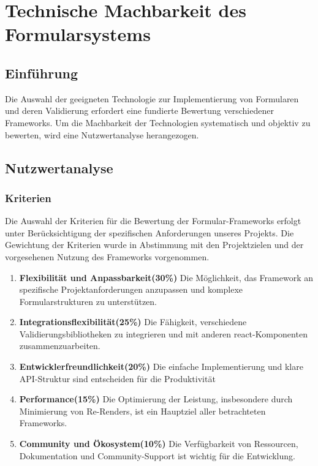 \section{Technische Machbarkeit des Formularsystems}

\subsection{Einführung}
Die Auswahl der geeigneten Technologie zur Implementierung von Formularen und deren Validierung erfordert eine fundierte Bewertung verschiedener Frameworks. Um die Machbarkeit der Technologien systematisch und objektiv zu bewerten, wird eine Nutzwertanalyse herangezogen. 

\subsection{Nutzwertanalyse}

\subsubsection{Kriterien}
Die Auswahl der Kriterien für die Bewertung der Formular-Frameworks erfolgt unter Berücksichtigung der spezifischen Anforderungen unseres Projekts. Die Gewichtung der Kriterien wurde in Abstimmung mit den Projektzielen und der vorgesehenen Nutzung des Frameworks vorgenommen.

\begin{enumerate}
	\item \textbf{Flexibilität und Anpassbarkeit(30\%)}  Die Möglichkeit, das Framework an spezifische Projektanforderungen anzupassen und komplexe Formularstrukturen zu unterstützen.
	\item \textbf{Integrationsflexibilität(25\%)} Die Fähigkeit, verschiedene Validierungsbibliotheken zu integrieren und mit anderen \gls{react}-Komponenten zusammenzuarbeiten.
	\item \textbf{Entwicklerfreundlichkeit(20\%)} Die einfache Implementierung und klare API-Struktur sind entscheiden für die Produktivität
	\item \textbf{Performance(15\%)} Die Optimierung der Leistung, insbesondere durch Minimierung von Re-Renders, ist ein Hauptziel aller betrachteten Frameworks.
	\item \textbf{Community und Ökosystem(10\%)} Die Verfügbarkeit von Ressourcen, Dokumentation und Community-Support ist wichtig für die Entwicklung.
\end{enumerate} 

